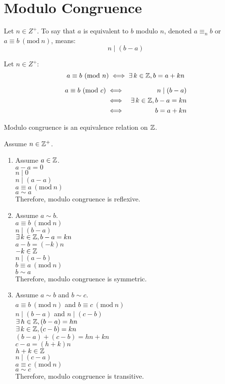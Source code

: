 \documentclass[letterpaper,12pt,fleqn]{article}
\newcommand{\emod}[3]{#1\equiv#2\ (\mbox{mod}\ #3)}
\begin{document}
\section*{Modulo Congruence}
\begin{definition}
Let $n\in Z^+$. To say that $a$ is equivalent to $b$ modulo $n$, denoted
$a\equiv_nb$ or $\emod{a}{b}{n}$, means:
\[n\mid(b-a)\]
\end{definition}
\begin{theorem}
Let $n\in Z^+$:
\[\emod{a}{b}{n}\iff\exists\,k\in\Z,b=a+kn\]
\end{theorem}
\begin{theproof}
\listbreak
\begin{eqnarray*}
\emod{a}{b}{c} &\iff& n\mid(b-a) \\
    &\iff& \exists\,k\in\Z,b-a=kn \\
    &\iff& b=a+kn \\
\end{eqnarray*}
\end{theproof}
\begin{theorem}
Modulo congruence is an equivalence relation on $\mathbb{Z}$.
\end{theorem}
\begin{theproof}
Assume $n\in\mathbb{Z}^+$.
\begin{enumerate}
\item Assume $a\in\mathbb{Z}$. \\
$a-a=0$ \\
$n\mid0$ \\
$n\mid(a-a)$ \\
$\emod{a}{a}{n}$ \\
$a\sim a$ \\
Therefore, modulo congruence is reflexive.

\item Assume $a\sim b$. \\
$\emod{a}{b}{n}$ \\
$n\mid(b-a)$ \\
$\exists\,k\in\mathbb{Z},b-a=kn$ \\
$a-b=(-k)n$ \\
$-k\in\mathbb{Z}$ \\
$n\mid(a-b)$ \\
$\emod{b}{a}{n}$ \\
$b\sim a$ \\
Therefore, modulo congruence is symmetric.
\newpage
\item Assume $a\sim b$ and $b\sim c$. \\
$\emod{a}{b}{n}$ and $\emod{b}{c}{n}$ \\
$n\mid(b-a)$ and $n\mid(c-b)$ \\
$\exists\,h\in\mathbb{Z},(b-a)=hn$ \\
$\exists\,k\in\mathbb{Z},(c-b)=kn$ \\
$(b-a)+(c-b)=hn+kn$ \\
$c-a=(h+k)n$ \\
$h+k\in\mathbb{Z}$ \\
$n\mid(c-a)$ \\
$\emod{a}{c}{n}$ \\
$a\sim c$ \\
Therefore, modulo congruence is transitive.
\end{enumerate}
\end{theproof}
\end{document}
